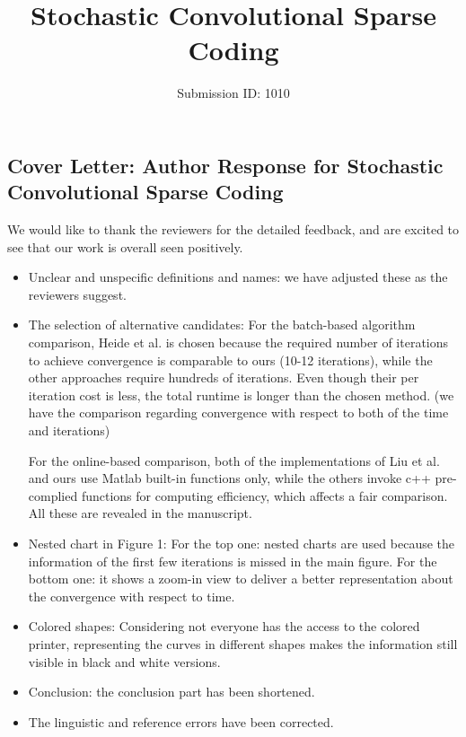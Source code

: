 \documentclass{egpubl}
\title{Stochastic Convolutional Sparse Coding}
\author{Submission ID: 1010}
\begin{document}
\begin{titlepage} 
\part*{Cover Letter: Author Response for Stochastic Convolutional Sparse Coding}

We would like to thank the reviewers for the detailed feedback, and are excited to see that our work is overall seen positively.

\begin{itemize}
\item Unclear and unspecific definitions and names: we have adjusted these as the reviewers suggest.

\item The selection of alternative candidates: For the batch-based algorithm comparison, Heide et al. is chosen because the required number of iterations to achieve convergence is comparable to ours (10-12 iterations), while the other approaches require hundreds of iterations. Even though their per iteration cost is less, the total runtime is longer than the chosen method. (we have the comparison regarding convergence with respect to both of the time and iterations)

For the online-based comparison, both of the implementations of Liu et al. and ours use Matlab built-in functions only, while the others invoke c++ pre-complied functions for computing efficiency, which affects a fair comparison. All these are revealed in the manuscript.

\item Nested chart in Figure 1: For the top one: nested charts are used because the information of the first few iterations is missed in the main figure.  For the bottom one: it shows a zoom-in view to deliver a better representation about the convergence with respect to time.

\item Colored shapes: Considering not everyone has the access to the colored printer, representing the curves in different shapes makes the information still visible in black and white versions.

\item Conclusion: the conclusion part has been shortened.

\item The linguistic and reference errors have been corrected.
\end{itemize}

\end{titlepage}
\end{document}

